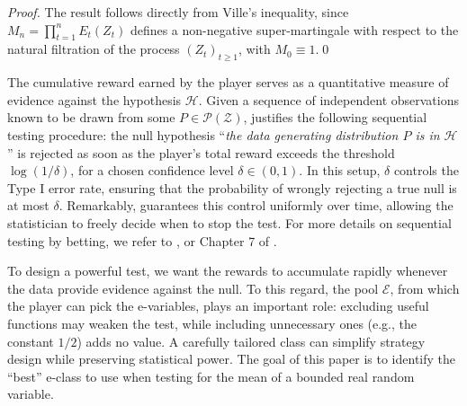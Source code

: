 \documentclass[3p, authoryear, 10pt]{elsarticle}%
\newcommand{\Ee}{\mathcal E}
\newcommand{\Hh}{\mathcal H}
\newcommand{\PR}{\mathcal P}
\newcommand{\Z}{\mathcal Z}
\begin{document}
\begin{proof}
    The result follows directly from Ville's inequality, since $M_n = \prod_{t=1}^n E_t(Z_t)$ defines a non-negative super-martingale with respect to the natural filtration of the process $(Z_t)_{t\geq 1}$, with $M_0\equiv 1$.\qed
\end{proof}
The cumulative reward earned by the player serves as a quantitative measure of evidence against the hypothesis $\Hh$. Given a sequence of independent observations known to be drawn from some $P\in\PR(\Z)$,  justifies the following sequential testing procedure: the null hypothesis ``\emph{the data generating distribution $P$ is in $\mathcal{H}$}'' is rejected as soon as the player's total reward exceeds the threshold $\log(1/\delta)$, for a chosen confidence level $\delta \in (0,1)$. In this setup, $\delta$ controls the Type I error rate, ensuring that the probability of wrongly rejecting a true null is at most $\delta$. Remarkably,   guarantees this control uniformly over time, allowing the statistician to freely decide when to stop the test. For more details on sequential testing by betting, we refer to \cite{ramdas2023game}, or Chapter 7 of \cite{ramdas2024hypothesis}.

To design a powerful test, we want the rewards to accumulate rapidly whenever the data provide evidence against the null. To this regard, the pool $\Ee$, from which the player can pick the e-variables, plays an important role: excluding useful functions may weaken the test, while including unnecessary ones (e.g., the constant $1/2$) adds no value. A carefully tailored class can simplify strategy design while preserving statistical power. The goal of this paper is to identify the ``best'' e-class to use when testing for the mean of a bounded real random variable.
\end{document}
